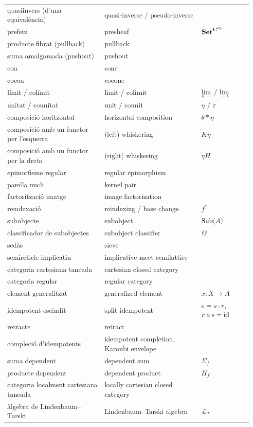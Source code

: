 \begin{xltabular}{\linewidth}{@{}>{\raggedright\arraybackslash}X >{\raggedright\arraybackslash}X l@{}}
quasiinvers (d'una equivalència) & quasi-inverse / pseudo-inverse & \\
prefeix & presheaf & $\mathbf{Set}^{\mathbf{C}^{\mathrm{op}}}$\\
producte fibrat (pullback) & pullback & \\
suma amalgamada (pushout) & pushout & \\
con & cone & \\
cocon & cocone & \\
límit / colímit & limit / colimit & $\varprojlim$ / $\varinjlim$\\
unitat / counitat & unit / counit & $\eta$ / $\varepsilon$\\
composició horitzontal & horizontal composition & $\theta\ast\eta$\\
composició amb un functor per l'esquerra & (left) whiskering & $K\eta$\\
composició amb un functor per la dreta & (right) whiskering & $\eta H$\\
epimorfisme regular & regular epimorphism & \\
parella nucli & kernel pair & \\
factorització imatge & image factorization & \\
reindexació & reindexing / base change & $f^{*}$\\
subobjecte & subobject & $\operatorname{Sub}(A)$\\
classificador de subobjectes & subobject classifier & $\Omega$\\
sedàs & sieve & \\
semireticle implicatiu & implicative meet-semilattice & \\
categoria cartesiana tancada & cartesian closed category & \\
categoria regular & regular category & \\
element generalitzat & generalized element & $x\colon X\to A$\\
idempotent escindit & split idempotent & $e=s\comp r$, $r\circ s=\operatorname{id}$\\
retracte & retract & \\
compleció d'idempotents & idempotent completion, Karoubi envelope & \\
suma dependent & dependent sum & $\Sigma_f$\\
producte dependent & dependent product & $\Pi_f$\\
categoria localment cartesiana tancada & locally cartesian closed category & \\
àlgebra de Lindenbaum--Tarski & Lindenbaum--Tarski algebra & $\mathcal L_T$\\
\hline
\end{xltabular}
\renewcommand{\arraystretch}{1.0}
